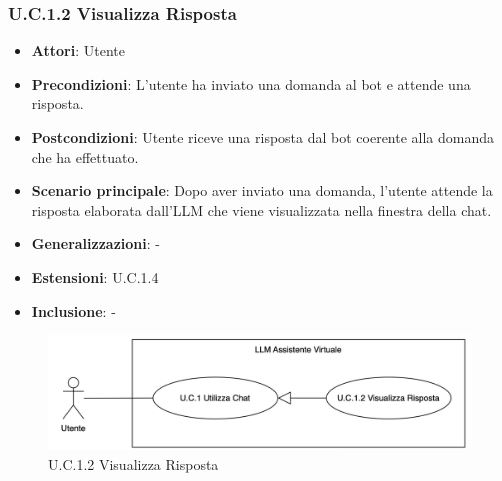 \subsubsection{U.C.1.2 Visualizza Risposta}
\begin{itemize}
    \item \textbf{Attori}: Utente
    \item \textbf{Precondizioni}: L'utente ha inviato una domanda al bot e attende una risposta.
    \item \textbf{Postcondizioni}: Utente riceve una risposta dal bot coerente alla domanda che ha effettuato.
    \item \textbf{Scenario principale}: Dopo aver inviato una domanda, l'utente attende la risposta elaborata dall’LLM che viene visualizzata nella finestra della chat.
    \item \textbf{Generalizzazioni}: -
    \item \textbf{Estensioni}: U.C.1.4
    \item \textbf{Inclusione}: -
\end{itemize}
\begin{figure}[H]
    \centering
    \includegraphics[width=\textwidth]{img/UC1.2.png}
    \caption{U.C.1.2 Visualizza Risposta}
\end{figure}
\newpage

